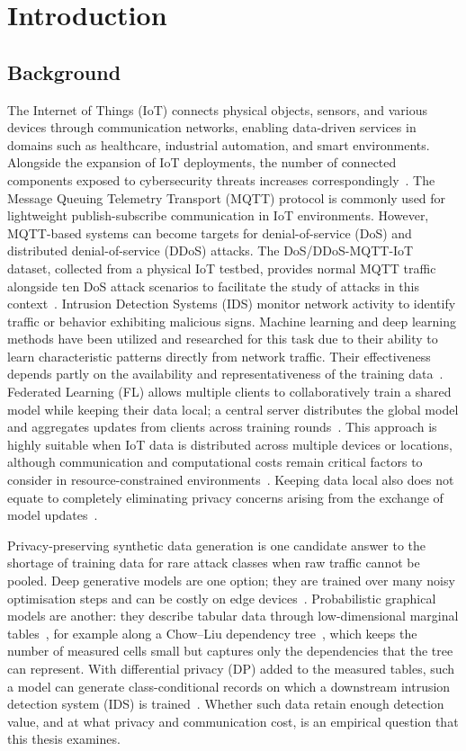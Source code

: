 \chapter{Introduction}

\section{Background}
The Internet of Things (IoT) connects physical objects, sensors, and various devices through communication networks, enabling data-driven services in domains such as healthcare, industrial automation, and smart environments. Alongside the expansion of IoT deployments, the number of connected components exposed to cybersecurity threats increases correspondingly~\cite{atzori2010}. The Message Queuing Telemetry Transport (MQTT) protocol is commonly used for lightweight publish-subscribe communication in IoT environments. However, MQTT-based systems can become targets for denial-of-service (DoS) and distributed denial-of-service (DDoS) attacks. The DoS/DDoS-MQTT-IoT dataset, collected from a physical IoT testbed, provides normal MQTT traffic alongside ten DoS attack scenarios to facilitate the study of attacks in this context~\cite{alatram2023}. Intrusion Detection Systems (IDS) monitor network activity to identify traffic or behavior exhibiting malicious signs. Machine learning and deep learning methods have been utilized and researched for this task due to their ability to learn characteristic patterns directly from network traffic. Their effectiveness depends partly on the availability and representativeness of the training data~\cite{he2009}. Federated Learning (FL) allows multiple clients to collaboratively train a shared model while keeping their data local; a central server distributes the global model and aggregates updates from clients across training rounds~\cite{mcmahan2017}. This approach is highly suitable when IoT data is distributed across multiple devices or locations, although communication and computational costs remain critical factors to consider in resource-constrained environments~\cite{shi2016, imteaj2022}. Keeping data local also does not equate to completely eliminating privacy concerns arising from the exchange of model updates~\cite{zhu2019}.

Privacy-preserving synthetic data generation is one candidate answer to the shortage of training data for rare attack classes when raw traffic cannot be pooled. Deep generative models are one option; they are trained over many noisy optimisation steps and can be costly on edge devices~\cite{behera2022fedsyn}. Probabilistic graphical models are another: they describe tabular data through low-dimensional marginal tables~\cite{zhang2017privbayes}, for example along a Chow--Liu dependency tree~\cite{chow1968}, which keeps the number of measured cells small but captures only the dependencies that the tree can represent. With differential privacy (DP) added to the measured tables, such a model can generate class-conditional records on which a downstream intrusion detection system (IDS) is trained~\cite{mckenna2019pgm, mckenna2024aim}. Whether such data retain enough detection value, and at what privacy and communication cost, is an empirical question that this thesis examines.
\clearpage
